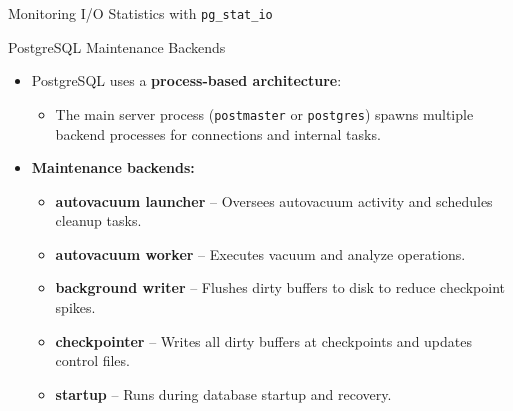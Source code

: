\documentclass[aspectratio=169]{beamer}
\begin{document}
\begin{frame}[fragile]{Monitoring I/O Statistics with \texttt{pg\_stat\_io}}
\end{frame}

\begin{frame}{PostgreSQL Maintenance Backends}
\begin{itemize}
    \item PostgreSQL uses a \textbf{process-based architecture}:
    \begin{itemize}
        \item The main server process (\texttt{postmaster} or \texttt{postgres}) spawns multiple backend processes for connections and internal tasks.
    \end{itemize}
    \item \textbf{Maintenance backends:}
    \begin{itemize}
        \item \textbf{autovacuum launcher} – Oversees autovacuum activity and schedules cleanup tasks.
        \item \textbf{autovacuum worker} – Executes vacuum and analyze operations.
        \item \textbf{background writer} – Flushes dirty buffers to disk to reduce checkpoint spikes.
        \item \textbf{checkpointer} – Writes all dirty buffers at checkpoints and updates control files.
        \item \textbf{startup} – Runs during database startup and recovery.
    \end{itemize}
\end{itemize}
\end{frame}
\end{document}
